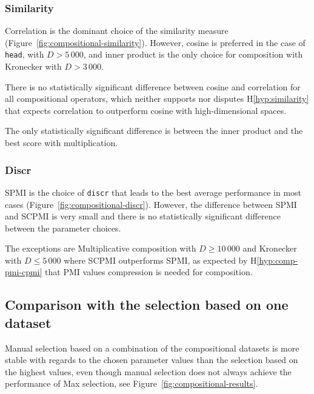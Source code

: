 \subsubsection{Similarity}
\label{sec:similarity-compositional}

Correlation is the dominant choice of the similarity measure (Figure~\ref{fig:compositional-similarity}). However, cosine is preferred in the case of \texttt{head}, with $D > 5\,000$, and inner product is the only choice for composition with Kronecker with $D > 3\,000$.

There is no statistically significant difference between cosine and correlation for all compositional operators, which neither supports nor disputes H\ref{hyp:similarity} that expects correlation to outperform cosine with high-dimensional spaces.

The only statistically significant difference is between the inner product and the best score with multiplication.

\subsubsection{Discr}
\label{sec:discr-compositional}





SPMI is the choice of \texttt{discr} that leads to the best average performance in most cases (Figure~\ref{fig:compositional-discr}). However, the difference between SPMI and SCPMI is very small and there is no statistically significant difference between the parameter choices.

The exceptions are Multiplicative composition with $D \geq 10\,000$ and Kronecker with $D \leq 5\,000$ where SCPMI outperforms SPMI, as expected by H\ref{hyp:comp-pmi-cpmi} that PMI values compression is needed for composition.

\subsection{Comparison with the selection based on one dataset}
\label{sec:comp-with-single-comp}

Manual selection based on a combination of the compositional datasets is more stable with regards to the chosen parameter values than the selection based on the highest values, even though manual selection does not always achieve the performance of Max selection, see Figure~\ref{fig:compositional-results}.

